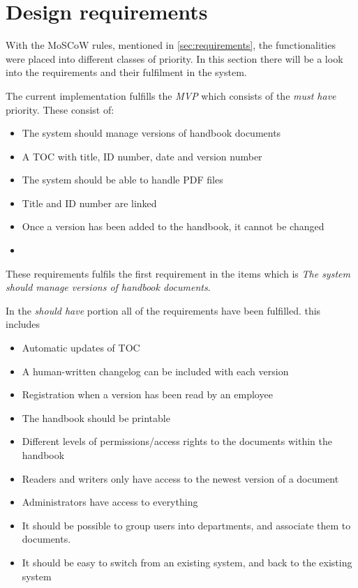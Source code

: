 \section{Design requirements}\label{sec:disdesignrequirements}
With the MoSCoW rules, mentioned in \cref{sec:requirements}, the functionalities were placed into different classes of priority.
In this section there will be a look into the requirements and their fulfilment in the system.

The current implementation fulfills the \textit{MVP} which consists of the \textit{must have} priority.
These consist of:

\begin{itemize}
	\item 
	The system should manage versions of handbook documents
	\item 
    A TOC with title, ID number, date and version number
    \item 
    The system should be able to handle PDF files
    \item 
    Title and ID number are linked
    \item 
    Once a version has been added to the handbook, it cannot be changed
	\item
\end{itemize}

These requirements fulfils the first requirement in the items which is \textit{The system should manage versions of handbook documents}.

In the \textit{should have} portion all of the requirements have been fulfilled.
this includes 

\begin{itemize}
	\item 
	Automatic updates of TOC
    \item 
	A human-written changelog can be included with each version
	\item 
    Registration when a version has been read by an employee
    \item 
    The handbook should be printable
    \item 
   	Different levels of permissions/access rights to the documents within the handbook
    \item 
    Readers and writers only have access to the newest version of a document
    \item 
    Administrators have access to everything
   	\item 
    It should be possible to group users into departments, and associate them to documents.
    \item 
    It should be easy to switch from an existing system, and back to the existing system
\end{itemize}

